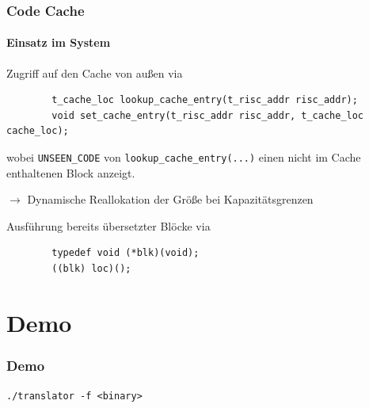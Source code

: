 \documentclass[german]{tum-presentation}
\newcommand{\refer}[0]{\ensuremath{\rightarrow} }
\begin{document}
\begin{frame}[fragile]
	\frametitle{Code Cache}
	\framesubtitle{Einsatz im System}
	
	Zugriff auf den Cache von außen via
	\begin{lstlisting}
		t_cache_loc lookup_cache_entry(t_risc_addr risc_addr);
		void set_cache_entry(t_risc_addr risc_addr, t_cache_loc cache_loc);
	\end{lstlisting}
	
	wobei \verb!UNSEEN_CODE! von \verb!lookup_cache_entry(...)! einen nicht im Cache enthaltenen Block anzeigt.
	
	\refer Dynamische Reallokation der Größe bei Kapazitätsgrenzen
	
	\vspace{0.5cm}
	\pause
	Ausführung bereits übersetzter Blöcke via
	\begin{lstlisting}
		typedef void (*blk)(void);
		((blk) loc)();
	\end{lstlisting}
\end{frame}


\section{Demo}
\begin{frame}[fragile, c]
	\frametitle{Demo}

	\begin{center}
		\Huge \texttt{./translator -f <binary>}
	\end{center}
\end{frame}
\end{document}

